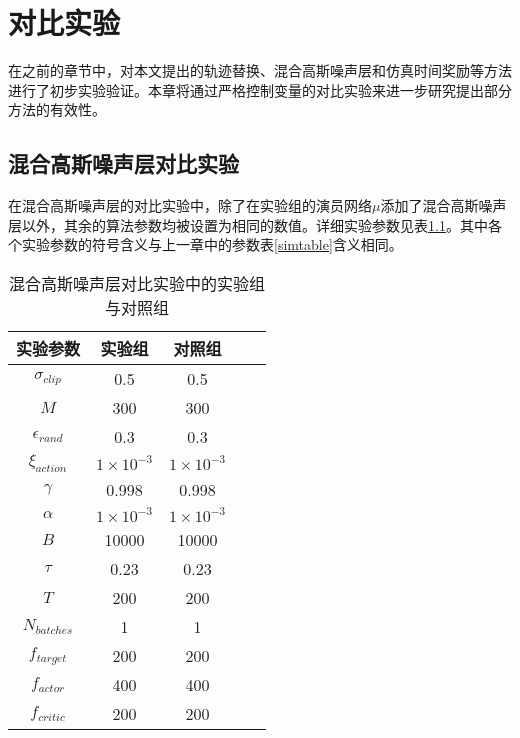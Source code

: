 \chapter{对比实验}
在之前的章节中，对本文提出的轨迹替换、混合高斯噪声层和仿真时间奖励等方法进行了初步实验验证。本章将通过严格控制变量的对比实验来进一步研究提出部分方法的有效性。

\section{混合高斯噪声层对比实验}
在混合高斯噪声层的对比实验中，除了在实验组的演员网络$\mu$添加了混合高斯噪声层以外，其余的算法参数均被设置为相同的数值。详细实验参数见表\ref{fcncmp}。其中各个实验参数的符号含义与上一章中的参数表\ref{simtable}含义相同。
    \begin{table}[htbp]
        \caption{混合高斯噪声层对比实验中的实验组与对照组}
        \label{fcncmp}
    \vspace{0.5em}\centering\wuhao
    \begin{tabular}{ccccc}
    \toprule[1.5pt]
        实验参数 & 实验组 & 对照组\\
    \midrule[1pt]
        $\sigma_{clip}$         & 0.5               & 0.5               \\
        $M$                     & 300               & 300               \\
        $\epsilon_{rand}$       & 0.3               & 0.3               \\
        $\xi_{action}$          & $1\times 10^{-3}$ & $1\times 10^{-3}$ \\
        $\gamma$                & 0.998             & 0.998             \\
        $\alpha$                & $1\times 10^{-3}$ & $1\times 10^{-3}$ \\
        $B$                     & 10000             & 10000             \\
        $\tau$                  & 0.23              & 0.23              \\
        $T$                     & 200               & 200               \\
        $N_{batches}$           & 1                 & 1                 \\
        $f_{target}$            & 200               & 200               \\
        $f_{actor}$             & 400               & 400               \\
        $f_{critic}$            & 200               & 200               \\

\end{tabular}
\end{table}
